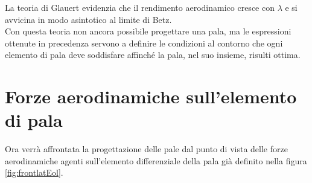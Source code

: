La teoria di Glauert evidenzia che il rendimento aerodinamico cresce con $\lambda$ e si avvicina in modo asintotico al limite di Betz. \\
Con questa teoria non ancora possibile progettare una pala, ma le espressioni ottenute in precedenza servono a definire le condizioni al contorno che ogni elemento di pala deve soddisfare affinché la pala, nel suo insieme, risulti ottima.

\section{Forze aerodinamiche sull'elemento di pala}
Ora verrà affrontata la progettazione delle pale dal punto di vista delle forze aerodinamiche agenti sull'elemento differenziale della pala già definito nella figura \ref{fig:frontlatEol}. 

